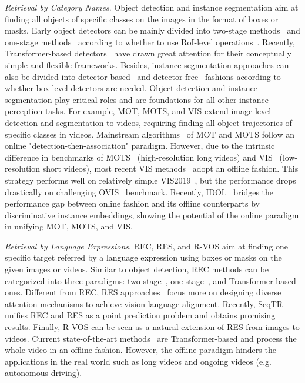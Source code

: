 \documentclass[10pt,twocolumn,letterpaper]{article}
\begin{document}
\textit{Retrieval by Category Names}. Object detection and instance segmentation aim at finding all objects of specific classes on the images in the format of boxes or masks. Early object detectors can be mainly divided into two-stage methods~\cite{FasterRCNN,CascadeRCNN,HTC} and one-stage methods~\cite{YOLO,RetinaNet,FCOS,ATSS,YOLOX} according to whether to use RoI-level operations~\cite{FastRCNN,MaskRCNN}. Recently, Transformer-based detectors~\cite{DETR,DeformableDETR,DN-DETR} have drawn great attention for their conceptually simple and flexible frameworks. Besides, instance segmentation approaches can also be divided into detector-based~\cite{MaskRCNN,CascadeRCNN,HTC,PointRend,CondInst} and detector-free~\cite{SOLO,Mask2Former} fashions according to whether box-level detectors are needed. Object detection and instance segmentation play critical roles and are foundations for all other instance perception tasks. 
For example, MOT, MOTS, and VIS extend image-level detection and segmentation to videos, requiring finding all object trajectories of specific classes in videos. Mainstream algorithms~\cite{DeepSORT,JDE,QDTrack,bytetrack,PCAN,Unicorn} of MOT and MOTS follow an online "detection-then-association" paradigm. However, due to the intrinsic difference in benchmarks of MOTS~\cite{MOTS,BDD100K} (high-resolution long videos) and VIS~\cite{VIS} (low-resolution short videos), most recent VIS methods~\cite{VISTR,IFC,ProposeReduce,SeqFormer} adopt an offline fashion. This strategy performs well on relatively simple VIS2019~\cite{VIS}, but the performance drops drastically on challenging OVIS~\cite{OVIS} benchmark. Recently, IDOL~\cite{IDOL} bridges the performance gap between online fashion and its offline counterparts by discriminative instance embeddings, showing the potential of the online paradigm in unifying MOT, MOTS, and VIS. 

\textit{Retrieval by Language Expressions}. REC, RES, and R-VOS aim at finding one specific target referred by a language expression using boxes or masks on the given images or videos. Similar to object detection, REC methods can be categorized into three paradigms: two-stage~\cite{CM-Att-Erase,DGA,RvG-Tree,NMTree}, one-stage~\cite{FAOA,RCCF,MCN,RESC}, and Transformer-based~\cite{TransVG,TRAR,MDETR} ones. Different from REC, RES approaches~\cite{CMSA,STEP,BRINet,EFN,CGAN,LTS,VLT} focus more on designing diverse attention mechanisms to achieve vision-language alignment. Recently, SeqTR~\cite{SeqTR} unifies REC and RES as a point prediction problem and obtains promising results. Finally, R-VOS can be seen as a natural extension of RES from images to videos. Current state-of-the-art methods~\cite{MTTR,ReferFormer} are Transformer-based and process the whole video in an offline fashion. However, the offline paradigm hinders the applications in the real world such as long videos and ongoing videos (e.g. autonomous driving).
\end{document}
